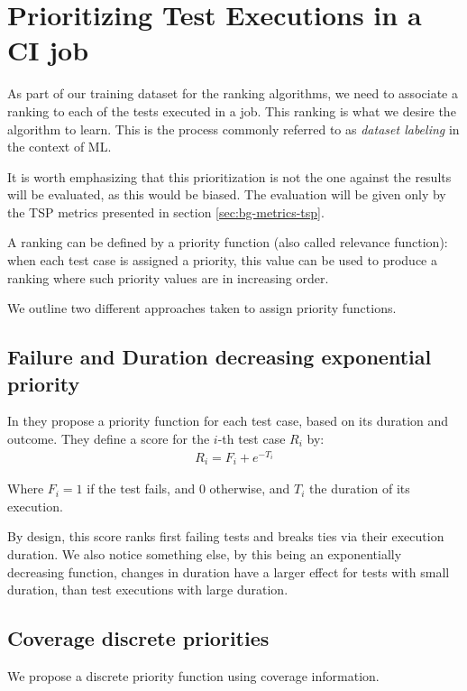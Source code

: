 \section{Prioritizing Test Executions in a CI job}\label{s:method-prioritizing-testruns}

As part of our training dataset for the ranking algorithms, we need to associate a ranking
to each of the tests executed in a job. This ranking is what we desire the algorithm to 
learn. This is the process commonly referred to as \emph{dataset labeling} in the context of ML.

It is worth emphasizing that this prioritization is not the one against the results
will be evaluated, as this would be biased. The evaluation will be given only by the 
TSP metrics presented in section \ref{sec:bg-metrics-tsp}.

A ranking can be defined by a priority function (also called relevance function): when each 
test case is assigned a priority, this value can be used to produce a ranking where such 
priority values are in increasing order.

We outline two different approaches taken to assign priority functions.

\subsection{Failure and Duration decreasing exponential priority}

In \cite{Bertolino2020LearningtoRankVR} they propose a priority function for each test case, based on its duration and outcome.
They define a score for the $i$-th test case $R_i$ by:
\begin{align*}
R_i = F_i + e^{-T_i}
\end{align*}

Where $F_i = 1$ if the test fails, and $0$ otherwise, and $T_i$ the duration of its execution.

By design, this score ranks first failing tests and breaks ties via their execution duration.
We also notice something else, by this being an exponentially decreasing function, changes
in duration have a larger effect for tests with small duration, than test executions with
large duration.

\subsection{Coverage discrete priorities}\label{s:method-prioritizingtestcases}
We propose a discrete priority function using coverage information. 


